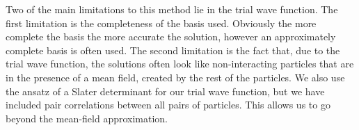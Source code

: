 Two of the main limitations to this method lie in the trial wave function. The first limitation is the completeness of the basis used. Obviously the more complete the basis the more accurate the solution, however an approximately complete basis is often used. The second limitation is the fact that, due to the trial wave function, the solutions often look like non-interacting particles that are in the presence of a mean field, created by the rest of the particles. We also use the ansatz of a Slater determinant for our trial wave function, but we have included pair correlations between all pairs of particles. This allows us to go beyond the mean-field approximation.
